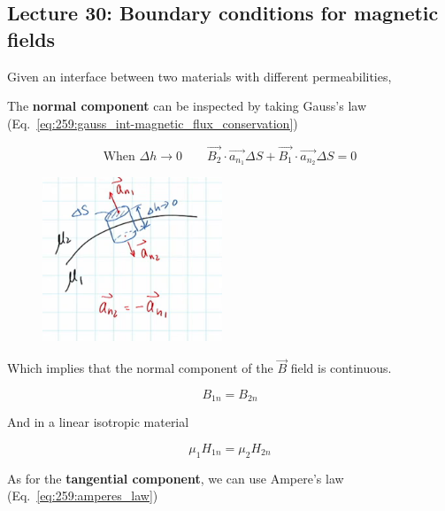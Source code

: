 \documentclass[10pt]{article}
\begin{document}
\subsection{Lecture 30: Boundary conditions for magnetic fields}


Given an interface between two materials with different permeabilities, 

The \textbf{normal component} can be inspected by taking Gauss's law (Eq.~\ref{eq:259:gauss_int-magnetic_flux_conservation}) 

\begin{equation}
\text{When } \Delta h \to 0 \qquad 
\vec{B_2} \cdot  \vec{a_{n_1}} \Delta S + 
\vec{B_1} \cdot  \vec{a_{n_2}} \Delta S = 0
\end{equation}
\begin{figure}[H]
	\centering
	\includegraphics[width=0.8\linewidth]{img/image_2022-04-11-23-40-04.png}
\end{figure}
Which implies that the normal component of the $ \vec{B} $ field is continuous. 


\begin{equation}
	B_{1n} = B_{2n} 
\end{equation}

And in a linear isotropic material

\begin{equation}
	\mu_1 H_{1n} = \mu_2 H_{2n}
	\label{eq:259:magnetic_boundary_cond_normal}
\end{equation}


As for the \textbf{tangential component}, we can use Ampere's law (Eq.~\ref{eq:259:amperes_law})
\end{document}
